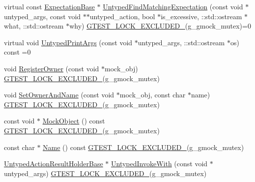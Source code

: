 \begin{DoxyCompactItemize}
\item 
virtual const \hyperlink{classtesting_1_1internal_1_1_expectation_base}{Expectation\+Base} $\ast$ \hyperlink{classtesting_1_1internal_1_1_untyped_function_mocker_base_a38714b44836c937fe95524f8d7063d04}{Untyped\+Find\+Matching\+Expectation} (const void $\ast$untyped\+\_\+args, const void $\ast$$\ast$untyped\+\_\+action, bool $\ast$is\+\_\+excessive, \+::std\+::ostream $\ast$what, \+::std\+::ostream $\ast$why) \hyperlink{gtest-port_8h_a69abff5a4efdd07bd5faebe3dd318d06}{G\+T\+E\+S\+T\+\_\+\+L\+O\+C\+K\+\_\+\+E\+X\+C\+L\+U\+D\+E\+D\+\_\+}(g\+\_\+gmock\+\_\+mutex)=0
\item 
virtual void \hyperlink{classtesting_1_1internal_1_1_untyped_function_mocker_base_ae8c91f05fc90e66a84df49aae8de0d41}{Untyped\+Print\+Args} (const void $\ast$untyped\+\_\+args, \+::std\+::ostream $\ast$os) const =0
\item 
void \hyperlink{classtesting_1_1internal_1_1_untyped_function_mocker_base_a0cd3dd14b92c714eab690c9597f32ffd}{Register\+Owner} (const void $\ast$mock\+\_\+obj) \hyperlink{gtest-port_8h_a69abff5a4efdd07bd5faebe3dd318d06}{G\+T\+E\+S\+T\+\_\+\+L\+O\+C\+K\+\_\+\+E\+X\+C\+L\+U\+D\+E\+D\+\_\+}(g\+\_\+gmock\+\_\+mutex)
\item 
void \hyperlink{classtesting_1_1internal_1_1_untyped_function_mocker_base_a287bcacee639b7d123cec29e0614fe96}{Set\+Owner\+And\+Name} (const void $\ast$mock\+\_\+obj, const char $\ast$name) \hyperlink{gtest-port_8h_a69abff5a4efdd07bd5faebe3dd318d06}{G\+T\+E\+S\+T\+\_\+\+L\+O\+C\+K\+\_\+\+E\+X\+C\+L\+U\+D\+E\+D\+\_\+}(g\+\_\+gmock\+\_\+mutex)
\item 
const void $\ast$ \hyperlink{classtesting_1_1internal_1_1_untyped_function_mocker_base_a71863dd67193a7082078d5b366d5ce51}{Mock\+Object} () const \hyperlink{gtest-port_8h_a69abff5a4efdd07bd5faebe3dd318d06}{G\+T\+E\+S\+T\+\_\+\+L\+O\+C\+K\+\_\+\+E\+X\+C\+L\+U\+D\+E\+D\+\_\+}(g\+\_\+gmock\+\_\+mutex)
\item 
const char $\ast$ \hyperlink{classtesting_1_1internal_1_1_untyped_function_mocker_base_ae90a5b5d48db1e99634bc6ff39ded335}{Name} () const \hyperlink{gtest-port_8h_a69abff5a4efdd07bd5faebe3dd318d06}{G\+T\+E\+S\+T\+\_\+\+L\+O\+C\+K\+\_\+\+E\+X\+C\+L\+U\+D\+E\+D\+\_\+}(g\+\_\+gmock\+\_\+mutex)
\item 
\hyperlink{classtesting_1_1internal_1_1_untyped_action_result_holder_base}{Untyped\+Action\+Result\+Holder\+Base} $\ast$ \hyperlink{classtesting_1_1internal_1_1_untyped_function_mocker_base_adaec41c0ba8a07c2415f6c8efa0ca54f}{Untyped\+Invoke\+With} (const void $\ast$untyped\+\_\+args) \hyperlink{gtest-port_8h_a69abff5a4efdd07bd5faebe3dd318d06}{G\+T\+E\+S\+T\+\_\+\+L\+O\+C\+K\+\_\+\+E\+X\+C\+L\+U\+D\+E\+D\+\_\+}(g\+\_\+gmock\+\_\+mutex)
\end{DoxyCompactItemize}

